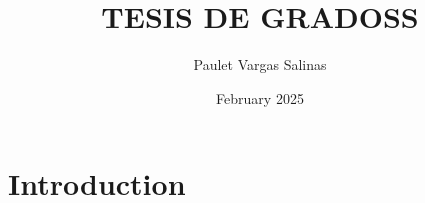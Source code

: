 \documentclass{article}
\title{TESIS DE GRADOSS}
\author{Paulet Vargas Salinas}
\date{February 2025}
\begin{document}
\maketitle

\section{Introduction}
\end{document}
